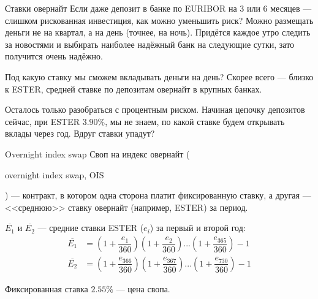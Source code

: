 \documentclass{beamer}
\renewcommand{\EUR}[1]{\textup{\euro}#1}
\newcommand{\en}[1]{\begin{otherlanguage}{english}#1\end{otherlanguage}}
\begin{document}
\begin{frame}{Ставки овернайт}
\justify
Если даже депозит в банке по EURIBOR на 3 или 6 месяцев --- слишком рискованная инвестиция, как можно уменьшить риск? Можно размещать деньги не на квартал, а на день (точнее, на ночь). Придётся каждое утро следить за новостями и выбирать наиболее надёжный банк на следующие сутки, зато получится очень надёжно.

\justify
Под какую ставку мы сможем вкладывать деньги на день? Скорее всего --- близко к ESTER, средней ставке по депозитам овернайт в крупных банках.

\justify
Осталось только разобраться с процентным риском. Начиная цепочку депозитов сейчас, при ESTER $3.90\%$, мы не знаем, по какой ставке будем открывать вклады через год. Вдруг ставки упадут?
\end{frame}



\begin{frame}{Overnight index swap}
\justify
Своп на индекс овернайт (\en{overnight index swap, OIS}) --- контракт, в котором одна сторона платит фиксированную ставку, а другая --- <<среднюю>> ставку овернайт (например, ESTER) за период.

\justify
\centering
{}

\justify
$\overline{E_1}$ и $\overline{E_2}$ --- средние ставки ESTER ($e_i$) за первый и второй год:
\begin{align*}
\overline{E_1} &= \left(1 + \dfrac{e_1}{360}\right)
\left(1 + \dfrac{e_2}{360}\right)
...
\left(1 + \dfrac{e_{365}}{360}\right) - 1 \\
\overline{E_2} &= \left(1 + \dfrac{e_{366}}{360}\right)
\left(1 + \dfrac{e_{367}}{360}\right)...
\left(1 + \dfrac{e_{730}}{360}\right) - 1
\end{align*}

\justify
Фиксированная ставка $2.55\%$ --- цена свопа.
\end{frame}
\end{document}
